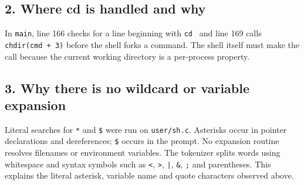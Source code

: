 \subsection{2. Where cd is handled and why}

In \texttt{main}, line 166 checks for a line beginning with \texttt{cd } and line 169 calls \texttt{chdir(cmd + 3)} before the shell forks a command. The shell itself must make the call because the current working directory is a per-process property.

\subsection{3. Why there is no wildcard or variable expansion}

Literal searches for \texttt{*} and \texttt{\$} were run on \texttt{user/\allowbreak{}sh.c}. Asterisks occur in pointer declarations and dereferences; \texttt{\$} occurs in the prompt. No expansion routine resolves filenames or environment variables. The tokenizer splits words using whitespace and syntax symbols such as \texttt{<}, \texttt{>}, \texttt{|}, \texttt{\&}, \texttt{;} and parentheses. This explains the literal asterisk, variable name and quote characters observed above.
